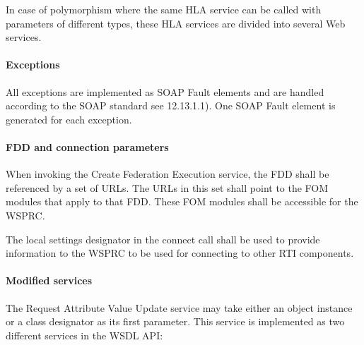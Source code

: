 \begin{compactstdpage}
    In case of polymorphism where the same HLA service can be called with parameters of different types, these HLA services are divided into several Web services.

    \paragraph{Exceptions}

    All exceptions are implemented as SOAP Fault elements and are handled according to the SOAP standard see 12.13.1.1). One SOAP Fault element is generated for each exception.

    \paragraph{FDD and connection parameters}

    When invoking the Create Federation Execution service, the FDD shall be referenced by a set of URLs. The URLs in this set shall point to the FOM modules that apply to that FDD. These FOM modules shall be accessible for the WSPRC.

    The local settings designator in the connect call shall be used to provide information to the WSPRC to be used for connecting to other RTI components.

    \paragraph{Modified services}

    The Request Attribute Value Update service may take either an object instance or a class designator as its first parameter. This service is implemented as two different services in the WSDL API:

\end{compactstdpage}

\clearpage

